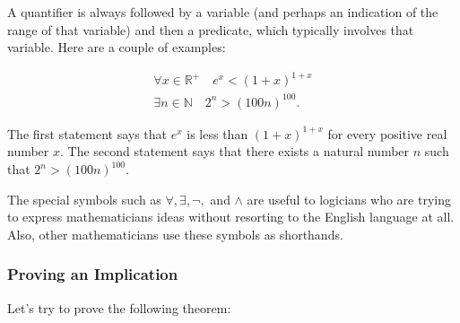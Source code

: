 \begin{definition}[Quantifiers]
  A quantifier is always followed by a variable (and perhaps an indication of
  the range of that variable) and then a predicate, which typically involves
  that variable. Here are a couple of examples:

  \begin{align}
    \forall x \in \mathbb{R}^{+} \quad e^{x} < (1 + x)^{1 + x} \\
    \exists n \in \mathbb{N} \quad 2^{n} > (100n)^{100}
  .\end{align}

  The first statement says that $e^{x}$ is less than $(1 + x)^{1 + x}$ for every
  positive real number $x$. The second statement says that there exists a
  natural number $n$ such that $2^{n} > (100n)^{100}$.

  The special symbols such as $\forall, \exists, \lnot,$ and $\land$ are useful
  to logicians who are trying to express mathematicians ideas without resorting to
  the English language at all. Also, other mathematicians use these symbols as
  shorthands.
\end{definition}


\subsubsection{Proving an Implication}
\label{sub_sub_sec:proving_an_implication}

Let's try to prove the following theorem:

